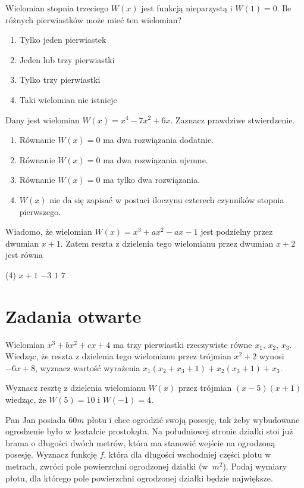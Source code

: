 \zadanie Wielomian stopnia trzeciego $W(x)$ jest funkcją nieparzystą i $W(1) = 0$. Ile różnych pierwiastków może mieć ten wielomian?
\begin{enumerate}[label=\alph*)]
	\item Tylko jeden pierwiastek
	\item Jeden lub trzy pierwiastki
	\item Tylko trzy pierwiastki %
	\item Taki wielomian nie istnieje
\end{enumerate}

\zadanie Dany jest wielomian $W(x) = x^4 - 7x^2 + 6x$. Zaznacz prawdziwe stwierdzenie.
\begin{enumerate}[label=\alph*)]
	\item Równanie $W(x) = 0$ ma dwa rozwiązania dodatnie. %
	\item Równanie $W(x) = 0$ ma dwa rozwiązania ujemne.
	\item Równanie $W(x) = 0$ ma tylko dwa rozwiązania.
	\item $W(x)$ nie da się zapisać w postaci iloczynu czterech czynników stopnia pierwszego.
\end{enumerate}

\zadanie Wiadomo, że wielomian $W(x) = x^3 + ax^2 - ax - 1$ jest podzielny przez dwumian $x + 1$. Zatem reszta z dzielenia tego wielomianu przez dwumian $x + 2$ jest równa
\begin{tasks}(4)
	\task $x + 1$
	\task $-3$ %
	\task $1$
	\task $7$
\end{tasks}

\section{Zadania otwarte}

\zadanie Wielomian $x^3 + bx^2 + cx + 4$ ma trzy pierwiastki rzeczywiste równe $x_1,\, x_2,\, x_3$. Wiedząc, że reszta z dzielenia tego wielomianu przez trójmian $x^2 + 2$ wynosi $-6x + 8$, wyznacz wartość wyrażenia $x_1(x_2 + x_3 + 1) + x_2(x_3 + 1) + x_3$. %

\zadanie Wyznacz resztę z dzielenia wielomianu $W(x)$ przez trójmian $(x - 5)(x + 1)$ wiedząc, że $W(5) = 10$ i $W(-1) = 4$. %

\zadanie Pan Jan posiada $60m$ płotu i chce ogrodzić swoją posesję, tak żeby wybudowane ogrodzenie było w kształcie prostokąta. Na południowej stronie działki stoi już brama o długości dwóch metrów, która ma stanowić wejście na ogrodzoną posesję. Wyznacz funkcję $f$, która dla długości wschodniej części płotu w metrach, zwróci pole powierzchni ogrodzonej działki (w~$m^2$). Podaj wymiary płotu, dla którego pole powierzchni ogrodzonej działki będzie największe. %

